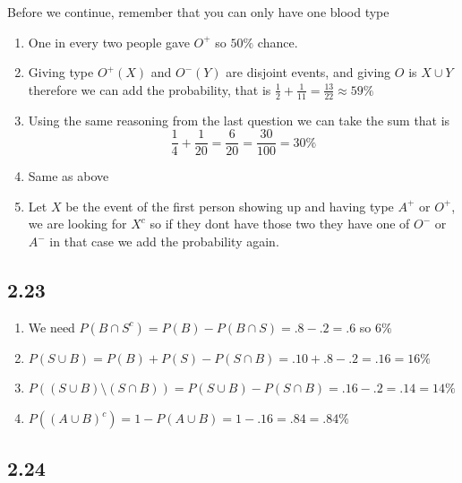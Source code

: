 \documentclass[11pt]{book}
\begin{document}
Before we continue, remember that you can only have one blood type
\begin{enumerate}[label=\alph*)]
    \item One in every two people gave $O^{+} $ so $50\%$ chance.
    \item Giving type $O^{+}(X) $ and $O^{-}(Y) $ are disjoint events, and giving $O$ is $X \cup Y$ therefore we can add the probability, that is $\frac{1}{2} + \frac{1}{11}= \frac{13}{22} \approx 59\%$ 
    \item Using the same reasoning from the last question we can take the sum that is 
        \[
        \frac{1}{4} + \frac{1}{20}= \frac{6}{20}= \frac{30}{100}= 30\%
        \]
    \item Same as above
    \item Let $X$ be the event of the first person showing up and having type $A^{+} $  or $O^{+} $, we are looking for $X^{c} $ so if they dont have those two they have one of $O^{-} $ or $A^{-} $ in that case we add the probability again.
\end{enumerate}


\subsection{2.23}%
\label{sub:2_23}

\begin{enumerate}[label=\alph*)]
    \item We need $P\left(B\cap S^{c} \right) = P\left(B\right)  - P\left(B\cap S\right) = .8  - .2 = .6$ so $6\%$ 
    \item $P\left(S\cup B\right) = P\left(B\right)  + P\left(S\right)  - P\left(S\cap B\right) = .10  + .8  - .2 = .16 = 16\%$ 
    \item $P\left(\left( S\cup B \right) \setminus \left( S\cap B \right) \right) = P\left(S\cup B\right)  - P\left(S\cap B\right) = .16  - .2= .14 = 14\%$ 
    \item $P\left(\left( A\cup B \right) ^{c} \right) = 1 - P\left(A\cup B\right) = 1  - .16= .84 = .84\%$ 
\end{enumerate}


\subsection{2.24}%
\label{sub:2_24}
\end{document}
